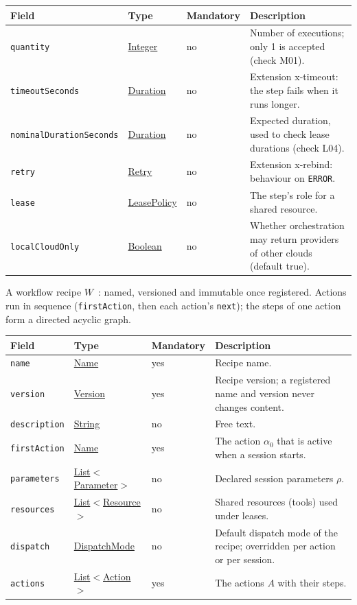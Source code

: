 \documentclass[a4paper]{arrowhead}
\newcommand{\mref}[1]{{\textcolor{ArrowheadPurple}{\hyperref[sec:model:#1]{#1}}}}
\newcommand{\pref}[1]{{\textcolor{ArrowheadGrey}{\hyperref[sec:model:primitives:#1]{#1}}}}
\begin{document}
{\small
\begin{longtable}{|p{3.7cm}|p{4.2cm}|p{1.6cm}|p{6.3cm}|}

\hline
\rowcolor{gray!33} Field & Type & Mandatory & Description \\ \hline
\endhead
\texttt{quantity} & \pref{Integer} & no & Number of executions; only 1 is accepted (check M01). \\ \hline
\texttt{timeoutSeconds} & \pref{Duration} & no & Extension x-timeout: the step fails when it runs longer. \\ \hline
\texttt{nominalDurationSeconds} & \pref{Duration} & no & Expected duration, used to check lease durations (check L04). \\ \hline
\texttt{retry} & \mref{Retry} & no & Extension x-rebind: behaviour on \texttt{ERROR}. \\ \hline
\texttt{lease} & \mref{LeasePolicy} & no & The step's role for a shared resource. \\ \hline
\texttt{localCloudOnly} & \pref{Boolean} & no & Whether orchestration may return providers of other clouds (default true). \\ \hline
\end{longtable}
}

A workflow recipe $W$~\cite{varga2026}: named, versioned and immutable once registered. Actions run in sequence (\texttt{firstAction}, then each action's \texttt{next}); the steps of one action form a directed acyclic graph.

{\small
\begin{longtable}{|p{3.7cm}|p{4.2cm}|p{1.6cm}|p{6.3cm}|}

\hline
\rowcolor{gray!33} Field & Type & Mandatory & Description \\ \hline
\endhead
\texttt{name} & \pref{Name} & yes & Recipe name. \\ \hline
\texttt{version} & \pref{Version} & yes & Recipe version; a registered name and version never changes content. \\ \hline
\texttt{description} & \pref{String} & no & Free text. \\ \hline
\texttt{firstAction} & \pref{Name} & yes & The action $\alpha_0$ that is active when a session starts. \\ \hline
\texttt{parameters} & \pref{List}$<$\mref{Parameter}$>$ & no & Declared session parameters $\rho$. \\ \hline
\texttt{resources} & \pref{List}$<$\mref{Resource}$>$ & no & Shared resources (tools) used under leases. \\ \hline
\texttt{dispatch} & \mref{DispatchMode} & no & Default dispatch mode of the recipe; overridden per action or per session. \\ \hline
\texttt{actions} & \pref{List}$<$\mref{Action}$>$ & yes & The actions $A$ with their steps. \\ \hline
\end{longtable}
}
\end{document}
